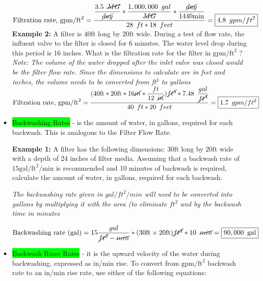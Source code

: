 \documentclass{article}
\begin{document}
\begin{itemize}
$\text{Filtration rate, } \mathrm{gpm} / \mathrm{ft}^{2} = 
\dfrac{
\dfrac{3.5 \enspace \cancel{MG}}{ \cancel{day}} * \dfrac{1,000,000 \enspace gal}{\cancel{MG}}
*\dfrac{\cancel{day}}{1440 \mathrm{ min}}}
{28 \enspace ft * 18 \enspace feet}= \boxed{4.8 \enspace gpm/ft^2}$\\
\vspace{0.2cm}
\textbf{Example 2:} A filter is $40 \mathrm{ft}$ long by $20 \mathrm{ft}$ wide. During a test of flow rate, the influent valve to the filter is closed for 6 minutes. The water level drop during this period is 16 inches. What is the filtration rate for the filter in $\mathrm{gpm} / \mathrm{ft}^{2}$ ?\\
\vspace{0.2cm}
\textit{Note:  The volume of the water dropped after the inlet valve was closed would be the filter flow rate.  Since the dimensions to calculate are in feet and inches, the volume needs to be converted from ft$^3$ to gallons}\\
\vspace{0.2cm}
$\text{Filtration rate, } \mathrm{gpm} / \mathrm{ft}^{2} = 
\dfrac{(
40 \mathrm{ ft}*20 \mathrm{ ft} * 16 \mathrm{\cancel{in}}*
\dfrac{ft}{12 \enspace \cancel{in}}
)
\cancel{ft^3}*7.48 \enspace 
\dfrac
{gal}
{\cancel{ft^3}}}
{40 \enspace ft * 20 \enspace feet}= \boxed{1.7\enspace gpm/ft^2}$\\

\item \colorbox{lime}{Backwashing Rates} - is the amount of water, in gallons, required for each backwash. This is analogous to the Filter Flow Rate.

\textbf{Example 1:}
A filter has the following dimensions: $30 \mathrm{ft}$ long by $20 \mathrm{ft}$ wide with a depth of 24 inches of filter media. Assuming that a backwash rate of $15 \mathrm{gal} / \mathrm{ft}^{2} / \mathrm{min}$ is recommended and 10 minutes of backwash is required, calculate the amount of water, in gallons, required for each backwash.

\textit{The backwashing rate given in $gal/ft^2/min$ will need to be converted into gallons by multiplying it with the area (to eliminate $ft^2$ and by the backwash time in minutes}

$ \text{Backwashing rate (gal)} = 15\dfrac{gal}{\cancel{ft^2}-\cancel{min}}*(30 \mathrm{ ft} \times 20 \mathrm{ ft})\cancel{ft^2}*10 \enspace \cancel{min}=\boxed{90,000 \enspace \text{gal}}$

\item \colorbox{lime}{Backwash Rinse Rates} - it is the upward velocity of the water during backwashing, expressed as in/min rise. To convert from $\mathrm{gpm} / \mathrm{ft}^{2}$ backwash rate to an in/min rise rate, use either of the following equations:


\end{itemize}
\end{document}
